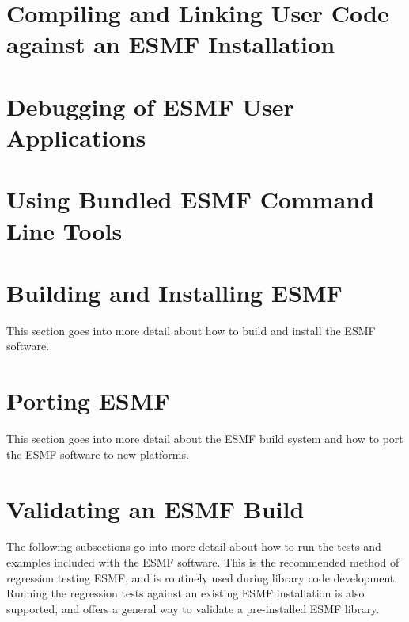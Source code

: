 
\section{Compiling and Linking User Code against an ESMF Installation}
\label{sec:Use}


\newpage

\section{Debugging of ESMF User Applications}
\label{sec:Debug}


\newpage

\section{Using Bundled ESMF Command Line Tools}
\label{sec:CLTs}


\newpage

\section{Building and Installing ESMF}
\label{sec:TechOver}

This section goes into more detail about how to build and install the ESMF
software.




\section{Porting ESMF}
\label{sec:TechOverPort}

This section goes into more detail about the ESMF build system and how to
port the ESMF software to new platforms.




\section{Validating an ESMF Build}
\label{sec:TechOver2}

The following subsections go into more detail about how to run the tests and
examples included with the ESMF software. This is the recommended method of
regression testing ESMF, and is routinely used during library code development.
Running the regression tests against an existing ESMF installation is also 
supported, and offers a general way to validate a pre-installed ESMF library.






